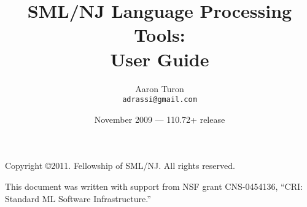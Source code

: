 \documentclass[11pt,letterpaper]{book}
\title{
  SML/NJ Language Processing Tools:\\
  User Guide}
\author{Aaron Turon\\
\texttt{adrassi@gmail.com}}
\date{November 2009 --- 110.72+ release}
\begin{document}
\frontmatter

	\maketitle
	
	\phantom{.}
	
	\noindent Copyright \copyright{}2011.  Fellowship of SML/NJ.  All rights reserved.
	
	\vskip 12pt
	\noindent This document was written with support from NSF grant CNS-0454136, ``CRI: Standard ML Software Infrastructure.''
	
	\pagebreak
	
	\tableofcontents

\mainmatter


	
	\newpage

	
	

	
		
		
		
		
	
%	
%		
%		


%		
%		


%	
%	
\end{document}
